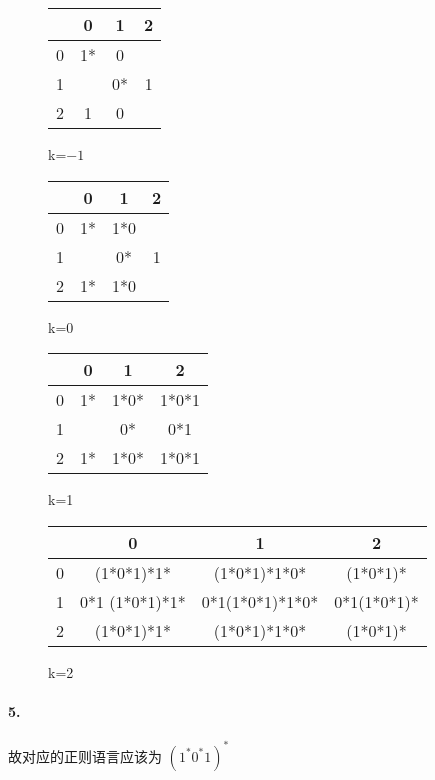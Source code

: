\documentclass[12pt]{ctexart}
\theoremstyle{definition}
\theoremstyle{definition}
\theoremstyle{plain}
\theoremstyle{remark}
\begin{document}
\begin{figure}
\centering
\begin{tabular}{c|c|c|c} \hline 
	 &0&1&2\\\hline
	0&1*&0& \\\hline
	1& &0*&1\\\hline
	2&1&0 & \\\hline  
\end{tabular}\caption{k=\(-1\)}
\end{figure}

\begin{figure}
\centering
\begin{tabular}{c|c|c|c} \hline 
	 &0&1&2\\\hline
	0&1*&1*0& \\\hline
	1& &0*&1\\\hline
	2&1*&1*0&\\\hline  
\end{tabular}\caption{k=0}
\end{figure}
\begin{figure}
\centering
\begin{tabular}{c|c|c|c} \hline 
	 &0&1&2\\\hline
	0&1*&1*0* &1*0*1\\\hline
	1&&0*&0*1 \\\hline
	2&1*&1*0*&1*0*1\\\hline  
\end{tabular}\caption{k=1}
\end{figure}

\begin{figure}
\centering
\begin{tabular}{c|c|c|c} \hline 
	 &0&1&2\\\hline
	0&(1*0*1)*1*&(1*0*1)*1*0*&(1*0*1)* \\\hline
	1&0*1 (1*0*1)*1*&0*1(1*0*1)*1*0*&0*1(1*0*1)* \\\hline
	2&(1*0*1)*1*&(1*0*1)*1*0*&(1*0*1)* \\\hline  
\end{tabular}\caption{k=2}
\end{figure}
\paragraph{5.} 故对应的正则语言应该为 \( (1 ^{*} 0 ^{*} 1 ) ^*\)
\end{document}
